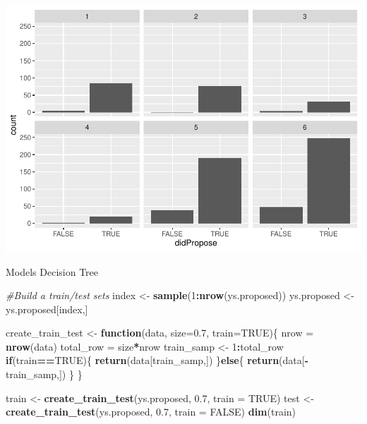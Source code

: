\documentclass[
]{article}
\newenvironment{Shaded}{\begin{snugshade}}{\end{snugshade}}
\newcommand{\CommentTok}[1]{\textcolor[rgb]{0.56,0.35,0.01}{\textit{#1}}}
\newcommand{\ControlFlowTok}[1]{\textcolor[rgb]{0.13,0.29,0.53}{\textbf{#1}}}
\newcommand{\DataTypeTok}[1]{\textcolor[rgb]{0.13,0.29,0.53}{#1}}
\newcommand{\DecValTok}[1]{\textcolor[rgb]{0.00,0.00,0.81}{#1}}
\newcommand{\FloatTok}[1]{\textcolor[rgb]{0.00,0.00,0.81}{#1}}
\newcommand{\KeywordTok}[1]{\textcolor[rgb]{0.13,0.29,0.53}{\textbf{#1}}}
\newcommand{\NormalTok}[1]{#1}
\newcommand{\OperatorTok}[1]{\textcolor[rgb]{0.81,0.36,0.00}{\textbf{#1}}}
\newcommand{\OtherTok}[1]{\textcolor[rgb]{0.56,0.35,0.01}{#1}}
\newcommand{\StringTok}[1]{\textcolor[rgb]{0.31,0.60,0.02}{#1}}
\begin{document}
\begin{Shaded}
\end{Shaded}

\includegraphics{ProposalAnalysis_files/figure-latex/unnamed-chunk-9-7.pdf}

Models Decision Tree

\begin{Shaded}
\begin{Highlighting}[]
\CommentTok{#Build a train/test sets}
\NormalTok{index <-}\StringTok{ }\KeywordTok{sample}\NormalTok{(}\DecValTok{1}\OperatorTok{:}\KeywordTok{nrow}\NormalTok{(ys.proposed))}
\NormalTok{ys.proposed <-}\StringTok{ }\NormalTok{ys.proposed[index,]}

\NormalTok{create_train_test <-}\StringTok{ }\ControlFlowTok{function}\NormalTok{(data, }\DataTypeTok{size=}\FloatTok{0.7}\NormalTok{, }\DataTypeTok{train=}\OtherTok{TRUE}\NormalTok{)\{}
\NormalTok{  nrow =}\StringTok{ }\KeywordTok{nrow}\NormalTok{(data)}
\NormalTok{  total_row =}\StringTok{ }\NormalTok{size}\OperatorTok{*}\NormalTok{nrow}
\NormalTok{  train_samp <-}\StringTok{ }\DecValTok{1}\OperatorTok{:}\NormalTok{total_row}
  \ControlFlowTok{if}\NormalTok{(train}\OperatorTok{==}\OtherTok{TRUE}\NormalTok{)\{}
    \KeywordTok{return}\NormalTok{(data[train_samp,])}
\NormalTok{  \}}\ControlFlowTok{else}\NormalTok{\{}
    \KeywordTok{return}\NormalTok{(data[}\OperatorTok{-}\NormalTok{train_samp,])}
\NormalTok{  \}}
\NormalTok{\}}

\NormalTok{train <-}\StringTok{ }\KeywordTok{create_train_test}\NormalTok{(ys.proposed, }\FloatTok{0.7}\NormalTok{, }\DataTypeTok{train =} \OtherTok{TRUE}\NormalTok{)}
\NormalTok{test <-}\StringTok{ }\KeywordTok{create_train_test}\NormalTok{(ys.proposed, }\FloatTok{0.7}\NormalTok{, }\DataTypeTok{train =} \OtherTok{FALSE}\NormalTok{)}
\KeywordTok{dim}\NormalTok{(train)}
\end{Highlighting}
\end{Shaded}
\end{document}
